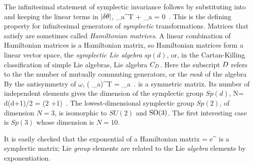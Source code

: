 The infinitesimal statement of symplectic invariance follows by
substituting  into  and keeping
the linear terms in $|\delta \theta|$,
\beq
 \Lg_a^T {\bf \omega} + {\bf \omega} \Lg_a = 0
\,.
This is the defining property for infinitesimal generators of {\em
symplectic} transformations. Matrices that satisfy  are
sometimes called \emph{Hamiltonian matrices}. A linear combination  of
Hamiltonian matrices is a Hamiltonian matrix, so Hamiltonian matrices
form a linear vector space, the \emph{symplectic
Lie algebra} $sp(d)$, or, in the Cartan-Killing classification of
simple Lie algebras, Lie algebra $C_{D}$. Here the subscript $D$
refers to the the number of mutually commuting generators,
or the \emph{rank} of the algebra
By the antisymmetry of $\omega$,
\beq
({\bf \omega} \Lg_a)^T = {\bf \omega} \Lg_a
\,.
is a symmetric matrix. Its number of independent elements gives the
dimension of the symplectic group $Sp(d)$,
\beq
N= {d(d+1)}/{2} = \DOF (2 \DOF+1)
\,.
The lowest-dimensional symplectic group $Sp(2)$, of dimension $N=3$,
is isomorphic to $SU(2)$ and $\textrm{SO}(3)$. The first interesting case is
$Sp(3)$ whose dimension is $N=10$.

It is easily checked that the exponential of a Hamiltonian matrix
\beq
\LieEl = e^{\gSpace \cdot {\Lg}}
is a symplectic matrix; Lie \emph{group} elements are related to the Lie
\emph{algebra} elements by exponentiation.


